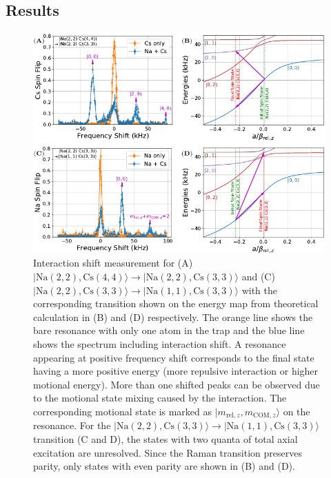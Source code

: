 \subsection{Results}
\label{ch:interaction-shift:spectroscopy:results}

\begin{figure}
  \centering
  \includegraphics[width=\textwidth]{figures/interaction_shift_results.pdf}
  \caption[Interaction shift measurement results.]{
    Interaction shift measurement for
    (A) $|\mathrm{Na(2, 2),Cs(4, 4)}\rangle\rightarrow|\mathrm{Na(2, 2),Cs(3, 3)}\rangle$
    and (C) $|\mathrm{Na(2, 2),Cs(3, 3)}\rangle\rightarrow|\mathrm{Na(1, 1),Cs(3, 3)}\rangle$
    with the corresponding transition shown on the energy map from theoretical calculation
    in (B) and (D) respectively.
    The orange line shows the bare resonance with only one atom in the trap
    and the blue line shows the spectrum including interaction shift.
    A resonance appearing at positive frequency shift corresponds to the final state
    having a more positive energy (more repulsive interaction or higher motional energy).
    More than one shifted peaks can be observed due to the motional state mixing caused
    by the interaction. The corresponding motional state is marked as
    $|m_{\mathrm{rel},z},m_{\mathrm{COM},z}\rangle$ on the resonance.
    For the $|\mathrm{Na(2, 2),Cs(3, 3)}\rangle\rightarrow|\mathrm{Na(1, 1),Cs(3, 3)}\rangle$
    transition (C and D), the states with two quanta of total axial excitation are unresolved.
    Since the Raman transition preserves parity, only states with even parity are shown
    in (B) and (D).
    \label{fig:interaction-shift:results}}
\end{figure}

